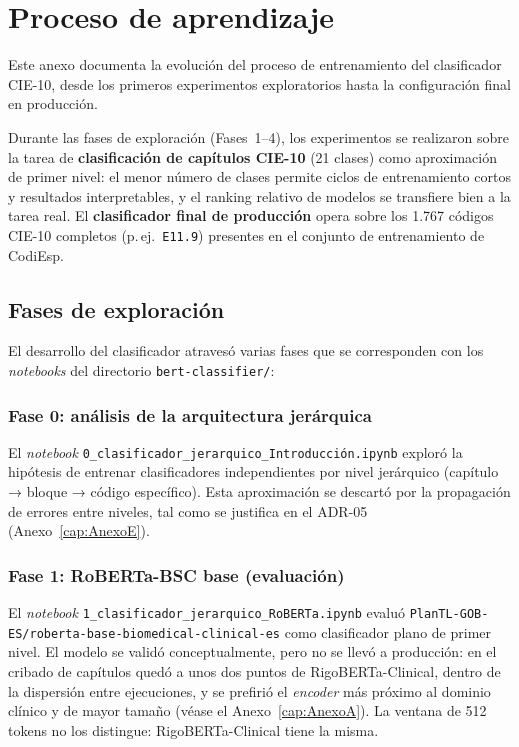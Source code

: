 \chapter{Proceso de aprendizaje}
\label{cap:AnexoF}

Este anexo documenta la evolución del proceso de entrenamiento del clasificador CIE-10, desde los primeros experimentos exploratorios hasta la configuración final en producción.

Durante las fases de exploración (Fases~1--4), los experimentos se realizaron sobre la tarea de \textbf{clasificación de capítulos CIE-10} (21 clases) como aproximación de primer nivel: el menor número de clases permite ciclos de entrenamiento cortos y resultados interpretables, y el ranking relativo de modelos se transfiere bien a la tarea real. El \textbf{clasificador final de producción} opera sobre los 1.767 códigos CIE-10 completos (p.\,ej.\ \texttt{E11.9}) presentes en el conjunto de entrenamiento de CodiEsp.

\section{Fases de exploración}

El desarrollo del clasificador atravesó varias fases que se corresponden con los \emph{notebooks} del directorio \texttt{bert-classifier/}:

\subsection{Fase 0: análisis de la arquitectura jerárquica}

El \emph{notebook} \texttt{0\_\allowbreak{}clasificador\_\allowbreak{}jerarquico\_\allowbreak{}Introducción.ipynb} exploró la hipótesis de entrenar clasificadores independientes por nivel jerárquico (capítulo → bloque → código específico). Esta aproximación se descartó por la propagación de errores entre niveles, tal como se justifica en el ADR-05 (Anexo~\ref{cap:AnexoE}).

\subsection{Fase 1: RoBERTa-BSC base (evaluación)}

El \emph{notebook} \texttt{1\_\allowbreak{}clasificador\_\allowbreak{}jerarquico\_\allowbreak{}RoBERTa.ipynb} evaluó \texttt{PlanTL-GOB-ES/\allowbreak{}roberta-base-\allowbreak{}biomedical-clinical-es} como clasificador plano de primer nivel. El modelo se validó conceptualmente, pero no se llevó a producción: en el cribado de capítulos quedó a unos dos puntos de RigoBERTa-Clinical, dentro de la dispersión entre ejecuciones, y se prefirió el \emph{encoder} más próximo al dominio clínico y de mayor tamaño (véase el Anexo~\ref{cap:AnexoA}). La ventana de 512 tokens no los distingue: RigoBERTa-Clinical tiene la misma.

